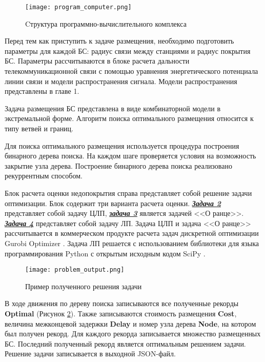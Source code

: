 \begin{figure}[h!]
  \centering
   \texttt{[image: program\_computer.png]}
\caption{Cтруктура программно-вычислительного комплекса}
\label{fig:part4_program_computer}
\end{figure}

Перед тем как приступить к задаче размещения, необходимо подготовить параметры для каждой БС: радиус связи между станциями и радиус покрытия БС. Параметры рассчитываются в блоке расчета дальности телекоммуникационной связи с помощью уравнения энергетического потенциала линии связи и модели распространения сигнала. Модели распространения представлены в главе 1.


Задача размещения БС представлена в виде комбинаторной модели в экстремальной форме. Алгоритм поиска оптимального размещения относится к типу ветвей и границ. 

Для поиска оптимального размещения используется процедура построения бинарного дерева поиска. На каждом шаге проверяется условия на возможность закрытие узла дерева. Построение бинарного дерева поиска реализовано рекуррентным способом.

Блок расчета оценки недопокрытия справа представляет собой решение задачи оптимизации. Блок содержит три варианта расчета оценки. \underline{\textit{\textbf{Задача 2}}} представляет собой задачу ЦЛП, \underline{\textit{\textbf{задача 3}}} является задачей <<О ранце>>. \underline{\textit{\textbf{Задача 4}}} представляет собой задачу ЛП. Задача ЦЛП и задача <<О ранце>> рассчитывается в коммерческом продукте расчета задач дискретной оптимизации Gurobi Optimizer \cite{gurobi}. Задача ЛП решается с использованием библиотеки для языка программирования Python с открытым исходным кодом SciPy \cite{scipy}. 


\begin{figure}[h!]
  \centering
   \texttt{[image: problem\_output.png]}
\caption{Пример полученного решения задачи}
\label{fig:part4_problem_output}
\end{figure}

В ходе движения по дереву поиска записываются все полученные рекорды \textbf{Optimal} (Рисунок \cref{fig:part4_problem_output}). Также записываются стоимость размещения \textbf{Cost}, величина межконцевой задержки \textbf{Delay} и номер узла дерева \textbf{Node}, на котором был получен рекорд. Для каждого рекорда записывается множество размещенных БС. Последний полученный рекорд является оптимальным решением задачи. Решение задачи записывается в выходной JSON-файл.

